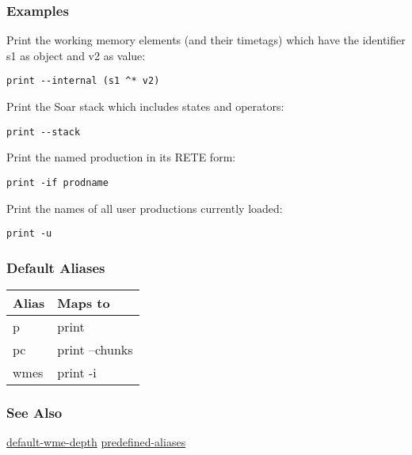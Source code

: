 \subsubsection*{Examples}
 Print the working memory elements (and their timetags) which have the identifier s1 as object and v2 as value: \begin{verbatim}
print --internal (s1 ^* v2)
\end{verbatim}
 Print the Soar stack which includes states and operators: \begin{verbatim}
print --stack
\end{verbatim}
 Print the named production in its RETE form: \begin{verbatim}
print -if prodname
\end{verbatim}
 Print the names of all user productions currently loaded: \begin{verbatim}
print -u
\end{verbatim}
\subsubsection*{Default Aliases}
\begin{tabular}{|l|l|}
\hline 
 Alias  & Maps to  \\
 \hline 
 p  & print  \\
 \hline 
 pc  & print --chunks  \\
 \hline 
 wmes  & print -i  \\
 \hline 
\end{tabular}
\subsubsection*{See Also}
\hyperref[default-wme-depth]{default-wme-depth} \hyperref[predefined-aliases]{predefined-aliases} 